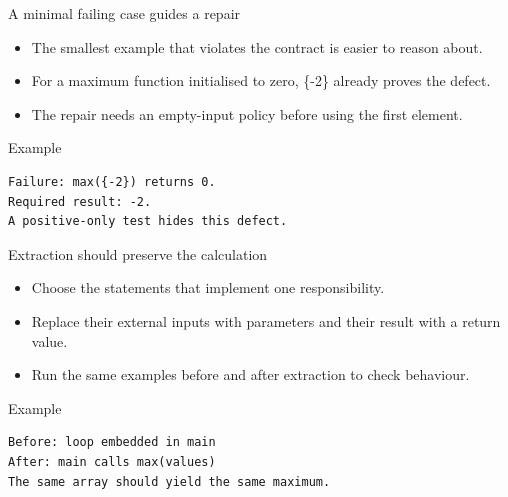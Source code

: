 \documentclass[10pt,aspectratio=169]{beamer}
\begin{document}
\begin{frame}[fragile,t]{A minimal failing case guides a repair}
\begin{itemize}
\item The smallest example that violates the contract is easier to reason about.
\item For a maximum function initialised to zero, \{-2\} already proves the defect.
\item The repair needs an empty-input policy before using the first element.
\end{itemize}
\vspace{1mm}\begin{block}{Example}
\begin{lstlisting}
Failure: max({-2}) returns 0.
Required result: -2.
A positive-only test hides this defect.
\end{lstlisting}
\end{block}
\end{frame}

\begin{frame}[fragile,t]{Extraction should preserve the calculation}
\begin{itemize}
\item Choose the statements that implement one responsibility.
\item Replace their external inputs with parameters and their result with a return value.
\item Run the same examples before and after extraction to check behaviour.
\end{itemize}
\vspace{1mm}\begin{block}{Example}
\begin{lstlisting}
Before: loop embedded in main
After: main calls max(values)
The same array should yield the same maximum.
\end{lstlisting}
\end{block}
\end{frame}
\end{document}
